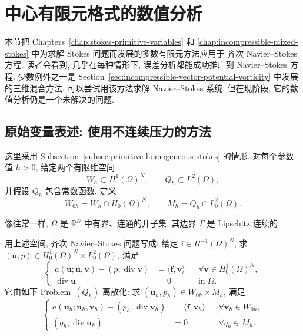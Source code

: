 \section{中心有限元格式的数值分析}
\label{sec:navier-centered-finite-elements}

本节把 Chapters~\ref{chap:stokes-primitive-variables} 和
\ref{chap:incompressible-mixed-stokes} 中为求解 Stokes 问题而发展的多数有限元方法应用于
齐次 Navier--Stokes 方程. 读者会看到, 几乎在每种情形下, 误差分析都能成功推广到
Navier--Stokes 方程. 少数例外之一是 Section~\ref{sec:incompressible-vector-potential-vorticity}
中发展的三维混合方法. 可以尝试用该方法求解 Navier--Stokes 系统, 但在现阶段,
它的数值分析仍是一个未解决的问题.

\subsection{原始变量表述: 使用不连续压力的方法}
\label{subsec:navier-centered-discontinuous-pressure}

这里采用 Subsection~\ref{subsec:primitive-homogeneous-stokes} 的情形.
对每个参数值 $h>0$, 给定两个有限维空间
\[
W_h\subset H^1(\Omega)^N,
\qquad Q_h\subset L^2(\Omega),
\]
并假设 $Q_h$ 包含常数函数. 定义
\[
W_{0h}=W_h\cap H_0^1(\Omega)^N,
\qquad M_h=Q_h\cap L_0^2(\Omega).
\]

像往常一样, $\Omega$ 是 $\mathbb R^N$ 中有界、连通的开子集, 其边界
$\Gamma$ 是 Lipschitz 连续的.

用上述空间, 齐次 Navier--Stokes 问题写成: 给定
$\boldsymbol f\in H^{-1}(\Omega)^N$, 求
$(\boldsymbol u,p)\in H_0^1(\Omega)^N\times L_0^2(\Omega)$, 满足
\begin{equation}\label{eq:navier-centered-continuous-mixed}
\left\{
\begin{aligned}
a(\boldsymbol u;\boldsymbol u,\boldsymbol v)
-(p,\operatorname{div}\boldsymbol v)
&=\langle\boldsymbol f,\boldsymbol v\rangle
&&\forall\boldsymbol v\in H_0^1(\Omega)^N,\\
\operatorname{div}\boldsymbol u&=0
&&\text{in }\Omega.
\end{aligned}
\right.
\end{equation}
它由如下 Problem~$(Q_h)$ 离散化: 求
$(\boldsymbol u_h,p_h)\in W_{0h}\times M_h$, 满足
\begin{equation}\label{eq:navier-centered-discrete-mixed}
\left\{
\begin{aligned}
a(\boldsymbol u_h;\boldsymbol u_h,\boldsymbol v_h)
-(p_h,\operatorname{div}\boldsymbol v_h)
&=\langle\boldsymbol f,\boldsymbol v_h\rangle
&&\forall\boldsymbol v_h\in W_{0h},\\
(q_h,\operatorname{div}\boldsymbol u_h)&=0
&&\forall q_h\in M_h.
\end{aligned}
\right.
\end{equation}

